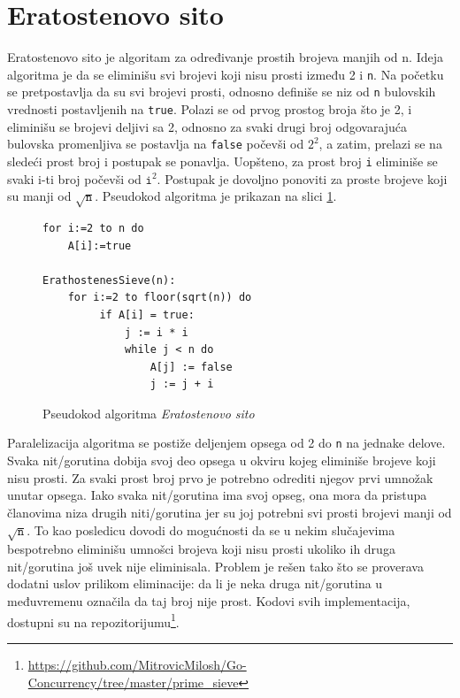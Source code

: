 \documentclass[12pt,oneside]{memoir}
\begin{document}
\section{Eratostenovo sito} \label{erathost}
Eratostenovo sito je algoritam za određivanje prostih brojeva manjih od n. Ideja algoritma je da se eliminišu svi brojevi koji nisu prosti između 2 i \texttt{n}. Na početku se pretpostavlja da su svi brojevi prosti, odnosno definiše se niz od \texttt{n} bulovskih vrednosti postavljenih na \texttt{true}. Polazi se od prvog prostog broja što je 2, i eliminišu se brojevi deljivi sa 2, odnosno za svaki drugi broj odgovarajuća bulovska promenljiva se postavlja na \texttt{false} počevši od $2^{2}$, a zatim, prelazi se na sledeći prost broj i postupak se ponavlja. Uopšteno, za prost broj \texttt{i} eliminiše se svaki i-ti broj počevši od  $\texttt{i}^{2}$. Postupak je dovoljno ponoviti za proste brojeve koji su manji od $\sqrt{\texttt{n}}$. Pseudokod algoritma je prikazan na slici \ref{fig:prime_pseudo}.

\begin{figure}
\begin{center}

\begin{Verbatim}[fontsize=\small]
for i:=2 to n do
    A[i]:=true

ErathostenesSieve(n):
    for i:=2 to floor(sqrt(n)) do 
         if A[i] = true:
             j := i * i
             while j < n do
                 A[j] := false 
                 j := j + i
\end{Verbatim}

\caption{Pseudokod algoritma \textit{Eratostenovo sito}}
\label{fig:prime_pseudo}
\end{center}
\end{figure}

Paralelizacija algoritma se postiže deljenjem opsega od 2 do \texttt{n} na jednake delove. Svaka nit/gorutina dobija svoj deo opsega u okviru kojeg eliminiše brojeve koji nisu prosti. Za svaki prost broj prvo je potrebno odrediti njegov prvi umnožak unutar opsega. Iako svaka nit/gorutina ima svoj opseg, ona mora da pristupa članovima niza drugih niti/gorutina jer su joj potrebni svi prosti brojevi manji od $\sqrt{\texttt{n}}$. To kao posledicu dovodi do mogućnosti da se u nekim slučajevima bespotrebno eliminišu umnošci brojeva koji nisu prosti ukoliko ih druga nit/gorutina još uvek nije eliminisala. Problem je rešen tako što se proverava dodatni uslov prilikom eliminacije: da li je neka druga nit/gorutina u međuvremenu označila da taj broj nije prost. Kodovi svih implementacija, dostupni su na repozitorijumu\footnote{\url{https://github.com/MitrovicMilosh/Go-Concurrency/tree/master/prime_sieve}}.
\end{document}
